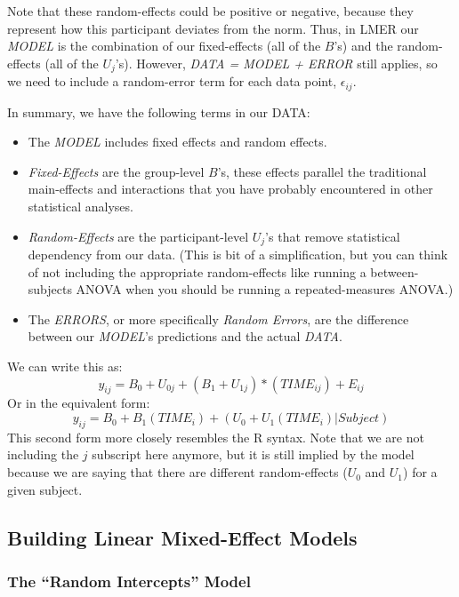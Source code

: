 \documentclass[]{article}
\providecommand{\tightlist}{%
  \setlength{\itemsep}{0pt}\setlength{\parskip}{0pt}}
\begin{document}
Note that these random-effects could be positive or negative, because
they represent how this participant deviates from the norm. Thus, in
LMER our \emph{MODEL} is the combination of our fixed-effects (all of
the \(B\)'s) and the random-effects (all of the \(U_j\)'s). However,
\emph{DATA = MODEL + ERROR} still applies, so we need to include a
random-error term for each data point, \(\epsilon_{ij}\).

In summary, we have the following terms in our DATA:

\begin{itemize}
\tightlist
\item
  The \emph{MODEL} includes fixed effects and random effects.
\item
  \emph{Fixed-Effects} are the group-level \(B\)'s, these effects
  parallel the traditional main-effects and interactions that you have
  probably encountered in other statistical analyses.
\item
  \emph{Random-Effects} are the participant-level \(U_j\)'s that remove
  statistical dependency from our data. (This is bit of a
  simplification, but you can think of not including the appropriate
  random-effects like running a between-subjects ANOVA when you should
  be running a repeated-measures ANOVA.)
\item
  The \emph{ERRORS}, or more specifically \emph{Random Errors}, are the
  difference between our \emph{MODEL}'s predictions and the actual
  \emph{DATA}.
\end{itemize}

We can write this as:
\[y_{ij} = B_0 + U_{0j} + (B_1+ U_{1j})*(TIME_{ij}) + E_{ij}\] Or in the
equivalent form:
\[y_{ij} = B_0 + B_1(TIME_i) + (U_0 + U_1(TIME_i)|Subject)\] This second
form more closely resembles the R syntax. Note that we are not including
the \(j\) subscript here anymore, but it is still implied by the model
because we are saying that there are different random-effects (\(U_0\)
and \(U_1\)) for a given subject.

\newpage

\subsection{Building Linear Mixed-Effect
Models}\label{building-linear-mixed-effect-models}

\subsubsection{\texorpdfstring{The ``Random Intercepts''
Model}{The Random Intercepts Model}}\label{the-random-intercepts-model}
\end{document}
